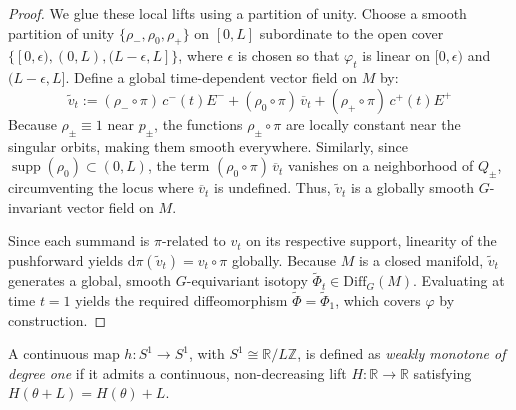 \documentclass[12pt,a4paper]{amsart}
\theoremstyle{plain}
\theoremstyle{definition}
\theoremstyle{remark}
\begin{document}
\begin{proof}
We glue these local lifts using a partition of unity. Choose a smooth partition of unity $\{\rho_-, \rho_0, \rho_+\}$ on $[0,L]$ subordinate to the open cover $\{[0, \epsilon), (0, L), (L-\epsilon, L]\}$, where $\epsilon$ is chosen so that $\varphi_t$ is linear on $[0, \epsilon)$ and $(L-\epsilon, L]$. Define a global time-dependent vector field on $M$ by:
\[
  \widetilde{v}_t := (\rho_- \circ \pi)\, c^-(t)E^- + (\rho_0 \circ \pi)\, \overline{v}_t + (\rho_+ \circ \pi)\, c^+(t)E^+
\]
Because $\rho_{\pm} \equiv 1$ near $p_{\pm}$, the functions $\rho_{\pm} \circ \pi$ are locally constant near the singular orbits, making them smooth everywhere. Similarly, since $\operatorname{supp}(\rho_0) \subset (0,L)$, the term $(\rho_0 \circ \pi)\,\overline{v}_t$ vanishes on a neighborhood of $Q_{\pm}$, circumventing the locus where $\overline{v}_t$ is undefined. Thus, $\widetilde{v}_t$ is a globally smooth $G$-invariant vector field on $M$.

Since each summand is $\pi$-related to $v_t$ on its respective support, linearity of the pushforward yields $\mathrm{d}\pi(\widetilde{v}_t) = v_t \circ \pi$ globally. Because $M$ is a closed manifold, $\widetilde{v}_t$ generates a global, smooth $G$-equivariant isotopy $\widetilde{\Phi}_t \in \mathrm{Diff}_G(M)$. Evaluating at time $t=1$ yields the required diffeomorphism $\widetilde{\Phi} = \widetilde{\Phi}_1$, which covers $\varphi$ by construction.
\end{proof}

A continuous map $h \colon S^1 \to S^1$, with $S^1 \cong \mathbb{R}/L\mathbb{Z}$, is defined as \emph{weakly monotone of degree one} if it admits a continuous, non-decreasing lift $H \colon \mathbb{R} \to \mathbb{R}$ satisfying $H(\theta+L) = H(\theta)+L$.
\end{document}
